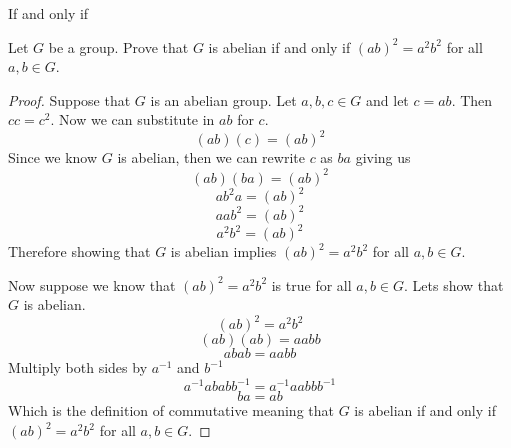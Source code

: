If and only if

Let $G$ be a group.  Prove that $G$ is abelian if and only if $(ab)^2=a^2b^2$ for all $a,b\in G$. 

\begin{proof}
Suppose that $G$ is an abelian group. Let $a,b,c \in G$ and let $c = ab$. Then $cc = c^2$. Now we can substitute in $ab$ for $c$.
$$(ab)(c) = (ab)^2 $$ Since we know $G$ is abelian, then we can rewrite $c$ as $ba$ giving us $$(ab)(ba) = (ab)^2 $$ $$ab^2a = (ab)^2$$ $$ aab^2 = (ab)^2$$ $$a^2b^2 = (ab)^2$$ Therefore showing that $G$ is abelian implies $(ab)^2=a^2b^2$ for all $a,b\in G$.

Now suppose we know that $(ab)^2=a^2b^2$ is true for all $a,b\in G$. Lets show that $G$ is abelian.
$$ (ab)^2 = a^2b^2 $$
$$(ab)(ab) = aabb $$
$$abab = aabb $$ Multiply both sides by $a^{-1}$ and $b^{-1}$
$$a^{-1}abab b^{-1} = a^{-1}aabb b^{-1}$$
$$ ba = ab$$
Which is the definition of commutative meaning that $G$ is abelian if and only if $(ab)^2=a^2b^2$ for all $a,b\in G$.
\end{proof}